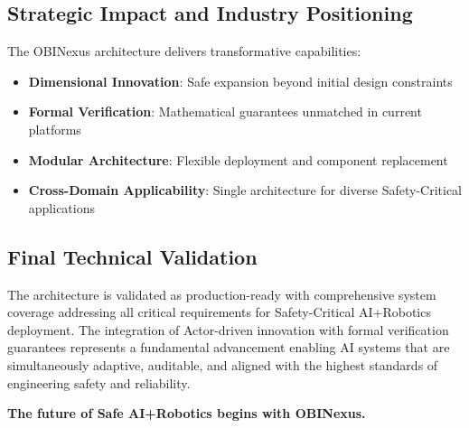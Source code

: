 \documentclass[12pt,a4paper]{article}
\begin{document}
\subsection{Strategic Impact and Industry Positioning}

The OBINexus architecture delivers transformative capabilities:

\begin{itemize}
    \item \textbf{Dimensional Innovation}: Safe expansion beyond initial design constraints
    \item \textbf{Formal Verification}: Mathematical guarantees unmatched in current platforms
    \item \textbf{Modular Architecture}: Flexible deployment and component replacement
    \item \textbf{Cross-Domain Applicability}: Single architecture for diverse Safety-Critical applications
\end{itemize}

\subsection{Final Technical Validation}

The architecture is validated as production-ready with comprehensive system coverage addressing all critical requirements for Safety-Critical AI+Robotics deployment. The integration of Actor-driven innovation with formal verification guarantees represents a fundamental advancement enabling AI systems that are simultaneously adaptive, auditable, and aligned with the highest standards of engineering safety and reliability.

\textbf{The future of Safe AI+Robotics begins with OBINexus.}

\clearpage
\end{document}
